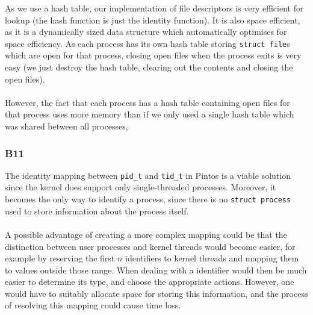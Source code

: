 \documentclass[a4wide, 11pt]{article}
\newcommand{\tx}{\texttt}
\begin{document}
As we use a hash table, our implementation of file descriptors is very efficient for lookup (the hash function is just the identity function). It is also space efficient, as it is a dynamically sized data structure which automatically optimises for space efficiency. As each process has its own hash table storing \tx{struct file}s which are open for that process, closing open files when the process exits is very easy (we just destroy the hash table, clearing out the contents and closing the open files).
\\\\
However, the fact that each process has a hash table containing open files for that process uses more memory than if we only used a single hash table which was shared between all processes, \\


\subsubsection{B11}
The identity mapping between \tx{pid\_t} and \tx{tid\_t} in Pintos is a viable solution since the kernel does support only single-threaded processes. Moreover, it becomes the only way to identify a process, since there is no \tx{struct process} used to store information about the process itself. 
\\\\
A possible advantage of creating a more complex mapping could be that the distinction between user processes and kernel threads would become easier, for example by reserving the first $n$ identifiers to kernel threads and mapping them to values outside those range. When dealing with a identifier would then be much easier to determine its type, and choose the appropriate actions. However, one would have to suitably allocate space for storing this information, and the process of resolving this mapping could cause time loss.  
\end{document}
